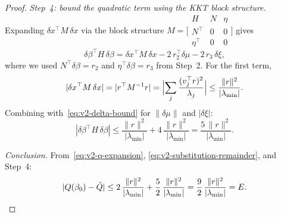\begin{proof}
\emph{Step~4: bound the quadratic term
  using the KKT block structure.}
Expanding $\delta x^\top M\,\delta x$
via the block structure
$M = \bigl[\begin{smallmatrix}
  H & N & \eta \\
  N^\top & 0 & 0 \\
  \eta^\top & 0 & 0
\end{smallmatrix}\bigr]$
gives
\begin{equation}\label{eq:v2-block-identity}
  \delta\beta^\top H\,\delta\beta
  = \delta x^\top M\,\delta x
    - 2\,r_2^\top\delta\mu
    - 2\,r_3\,\delta\xi,
\end{equation}
where we used $N^\top\delta\beta = r_2$
and $\eta^\top\delta\beta = r_3$ from Step~2.
For the first term,
\[
  |\delta x^\top M\,\delta x|
  = |r^\top M^{-1} r|
  = \Bigl|\sum_j \frac{(v_j^\top r)^2}{\lambda_j}\Bigr|
  \leq \frac{\|r\|^2}{|\lambda_{\min}|}.
\]
Combining with~\eqref{eq:v2-delta-bound}
for $\|\delta\mu\|$ and $|\delta\xi|$:
\[
  |\delta\beta^\top H\,\delta\beta|
  \leq \frac{\|r\|^2}{|\lambda_{\min}|}
    + 4\,\frac{\|r\|^2}{|\lambda_{\min}|}
  = \frac{5\,\|r\|^2}{|\lambda_{\min}|}.
\]


\emph{Conclusion.}
From~\eqref{eq:v2-q-expansion},
\eqref{eq:v2-substitution-remainder},
and Step~4:
\[
  |Q(\beta_0) - \tilde Q|
  \leq 2\,\frac{\|r\|^2}{|\lambda_{\min}|}
    + \frac{5}{2}\,\frac{\|r\|^2}{|\lambda_{\min}|}
  = \frac{9}{2}\,\frac{\|r\|^2}{|\lambda_{\min}|}
  = E.
  \qedhere
\]
\end{proof}


